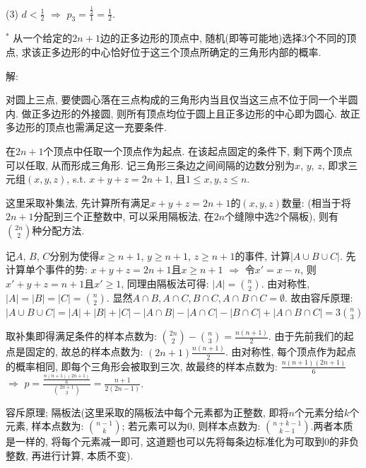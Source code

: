 \documentclass[standard]{ExBook}
\begin{document}
\begin{qitems}
\begin{bbox}
(3) $d < \frac{1}{2}$ $\Longrightarrow$ $p_{3}=\frac{\frac{1}{2}}{1}=\frac{1}{2}$.
    \end{bbox}

\vspace{-5em}

    \begin{bbox}
    \begin{shaded}
        \qitem$^*$
从一个给定的$2n + 1$边的正多边形的顶点中, 随机(即等可能地)选择3个不同的顶点, 求该正多边形的中心恰好位于这三个顶点所确定的三角形内部的概率.
    \end{shaded}
    \end{bbox}

\vspace{-5em}

    \begin{bbox}
解:

对圆上三点, 要使圆心落在三点构成的三角形内当且仅当这三点不位于同一个半圆内. 做正多边形的外接圆, 则所有顶点均位于圆上且正多边形的中心即为圆心. 故正多边形的顶点也需满足这一充要条件.

在$2n+1$个顶点中任取一个顶点作为起点. 在该起点固定的条件下, 剩下两个顶点可以任取, 从而形成三角形. 记三角形三条边之间间隔的边数分别为$x$, $y$, $z$, 即求三元组$(x,y,z)$, s.t. $x+y+z=2n+1$, 且$1\leq x,y,z\leq n$. 

这里采取补集法, 先计算所有满足$x+y+z=2n+1$的$(x,y,z)$数量: (相当于将$2n+1$分配到三个正整数中, 可以采用隔板法, 在$2n$个缝隙中选2个隔板), 则有$\binom{2n}{2}$种分配方法.

记$A$, $B$, $C$分别为使得$x \geq n+1$, $y \geq n+1$, $z \geq n+1$的事件, 计算$|A\cup B\cup C|$. 先计算单个事件的势: $x+y+z=2n+1$且$x \geq n+1$ $\Longrightarrow$ 令$x'=x-n$, 则$x'+y+z=n+1$且$x' \geq 1$, 同理由隔板法可得: $|A|=\binom{n}{2}$. 由对称性, $|A|=|B|=|C|=\binom{n}{2}$. 显然$A\cap B,A\cap C,B\cap C,A\cap B\cap C=\emptyset$. 故由容斥原理: $|A\cup B\cup C|=|A|+|B|+|C|-|A\cap B|-|A\cap C|-|B\cap C|+|A\cap B\cap C|=3\binom{n}{3}$

取补集即得满足条件的样本点数为: $\binom{2n}{2}-\binom{n}{3}=\frac{n(n+1)}{2}$. 由于先前我们的起点是固定的, 故总的样本点数为: $(2n+1)\frac{n(n+1)}{2}$. 由对称性, 每个顶点作为起点的概率相同, 即每个三角形会被取到三次, 故最终的样本点数为: $\frac{n(n+1)(2n+1)}{6}$ $\Longrightarrow$ $p=\frac{\frac{n(n+1)(2n+1)}{6}}{\binom{2n+1}{3}}=\frac{n+1}{2(2n-1)}$.
    \end{bbox}

\vspace{-5em}

    \begin{bbox}
\textcolor{themeColor}{\selectfont {} 容斥原理; 隔板法(这里采取的隔板法中每个元素都为正整数, 即将$n$个元素分给$k$个元素, 样本点数为: $\binom{n-1}{k}$; 若元素可以为0, 则样本点数为: $\binom{n+k-1}{k-1}$.两者本质是一样的, 将每个元素减一即可, 这道题也可以先将每条边标准化为可取到0的非负整数, 再进行计算, 本质不变).}


\end{bbox}
\end{qitems}
\end{document}

